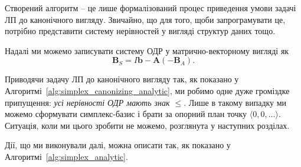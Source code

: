 \documentclass[\main/book.tex]{subfiles}
\begin{document}
\begin{algorithm}
\begin{algorithmic}
  \State {}
 \EndFunction
\end{algorithmic}
\end{algorithm}

Створений алгоритм -- це лише формалізований процес приведення умови задачі ЛП до канонічного вигляду. Звичайно, що для того, щоби запрограмувати це, потрібно представити систему нерівностей у вигляді структур даних тощо.

Надалі ми можемо записувати систему ОДР у матрично-векторному вигляді як
\[
 \mathbf{B}_S = I \mathbf{b} - \mathbf{A} (- \mathbf{B}_A)
 \text{.}
\]

\begin{note}
 Приводячи задачу ЛП до канонічного вигляду так, як показано у Алгоритмі~\ref{alg:simplex_canonizing_analytic}, ми робимо одне дуже громіздке припущення: \textit{усі нерівності ОДР мають знак \flqq{}$\leq$\frqq{}}. Лише в такому випадку ми можемо сформувати симплекс-базис і брати за опорний план точку $\langle 0, 0, \ldots \rangle$. Ситуація, коли ми цього зробити не можемо, розглянута у наступних розділах.
\end{note}

Дії, що ми виконували далі, можна описати так, як показано у Алгоритмі~\ref{alg:simplex_analytic}.
\end{document}
